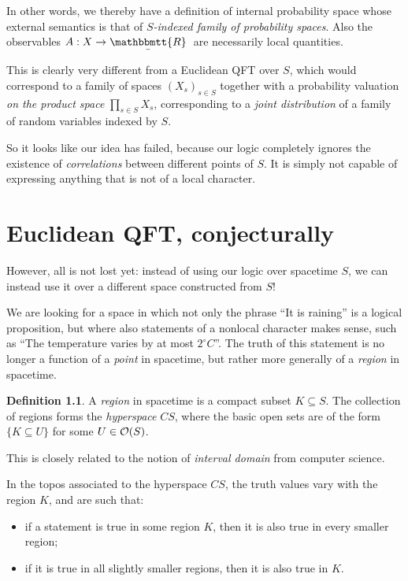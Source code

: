 \documentclass[11pt, oneside, article]{memoir}
\theoremstyle{plain}
\theoremstyle{definition}
\newtheorem{definition}[theorem]{Definition}
\theoremstyle{remark}
\newcommand{\ubar}[1]{\underaccent{\bar}{#1}}
\newcommand{\internal}[1]{\raisebox{-.03ex}{$\mathbbmtt{#1}$}}
\newcommand{\hs}{\hspace{1.1pt}}
\newcommand{\tRR}{\internal{R}\hs}
\newcommand{\tLR}{\ubar{\tRR}\hs}
\begin{document}
In other words, we thereby have a definition of internal probability space whose external semantics is that of \emph{$S$-indexed family of probability spaces}. Also the observables $A : X \to \tLR$ are necessarily local quantities.

This is clearly very different from a Euclidean QFT over $S$, which would correspond to a family of spaces $(X_s)_{s\in S}$ together with a probability valuation \emph{on the product space} $\prod_{s\in S} X_s$, corresponding to a \emph{joint distribution} of a family of random variables indexed by $S$.

So it looks like our idea has failed, because our logic completely ignores the existence of \emph{correlations} between different points of $S$. It is simply not capable of expressing anything that is not of a local character.

\chapter{Euclidean QFT, conjecturally}

However, all is not lost yet: instead of using our logic over spacetime $S$, we can instead use it over a different space constructed from $S$!

We are looking for a space in which not only the phrase ``It is raining'' is a logical proposition, but where also statements of a nonlocal character makes sense, such as ``The temperature varies by at most $2^\circ C$''. The truth of this statement is no longer a function of a \emph{point} in spacetime, but rather more generally of a \emph{region} in spacetime.

\begin{definition}
A \emph{region} in spacetime is a compact subset $K \subseteq S$. The collection of regions forms the \emph{hyperspace} $CS$, where the basic open sets are of the form $\{ K \subseteq U \}$ for some $U\in\mathcal{O}(S)$.
\end{definition}

This is closely related to the notion of \emph{interval domain} from computer science.

In the topos associated to the hyperspace $CS$, the truth values vary with the region $K$, and are such that:
\begin{itemize}
\item if a statement is true in some region $K$, then it is also true in every smaller region; 
\item if it is true in all slightly smaller regions, then it is also true in $K$.
\end{itemize}
\end{document}
